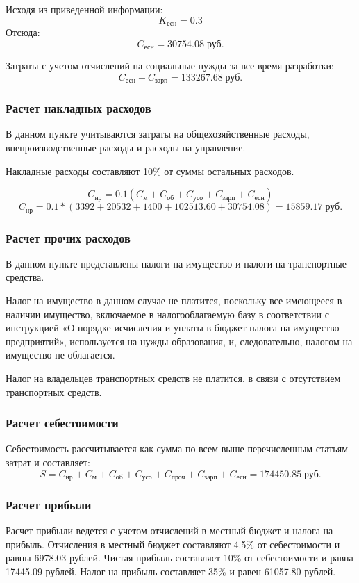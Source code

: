 \documentclass[russian,utf8,emptystyle]{eskdtext}
\begin{document}
\begin{spacing}{1.5}
Исходя из приведенной информации:
$$
K_\text{есн} = 0.3
$$
Отсюда:
$$
C_\text{есн} = 30754.08 \; \text{руб.}
$$

Затраты с учетом отчислений на социальные нужды за все время разработки:
$$
C_\text{есн} + C_\text{зарп} = 133267.68 \; \text{руб.}
$$

\subsubsection{Расчет накладных расходов}

В данном пункте учитываются затраты на общехозяйственные расходы, внепроизводственные расходы и расходы на управление.

Накладные расходы составляют 10\% от суммы остальных расходов.

$$
C_\text{нр} = 0.1(C_\text{м} + C_\text{об} + C_\text{усо} + C_\text{зарп} + C_\text{есн}) 
$$
$$
C_\text{нр} = 0.1*(3392 + 20532 + 1400 + 102513.60 + 30754.08) = 15859.17 \; \text{руб.}
$$

\subsubsection{Расчет прочих расходов}
В данном пункте представлены налоги на имущество и налоги на транспортные средства.

Налог на имущество в данном случае не платится, поскольку все имеющееся в наличии имущество, включаемое в налогооблагаемую базу в соответствии с инструкцией «О порядке исчисления и уплаты в бюджет налога на имущество предприятий», используется на нужды образования, и, следовательно, налогом на имущество не облагается.

Налог на владельцев транспортных средств не платится, в связи с отсутствием транспортных средств. 

\subsubsection{Расчет себестоимости}
Себестоимость рассчитывается как сумма по всем выше перечисленным статьям затрат и составляет:
$$
S = C_\text{нр} + C_\text{м} + C_\text{об} + C_\text{усо} + C_\text{проч} + C_\text{зарп} + C_\text{есн} = 174450.85 \; \text{руб.}
$$

\subsubsection{Расчет прибыли}
Расчет прибыли ведется с учетом отчислений в местный бюджет и налога на прибыль. Отчисления в местный бюджет составляют 4.5\% от себестоимости и равны 6978.03 рублей. Чистая прибыль составляет 10\% от себестоимости и равна 17445.09 рублей. Налог на прибыль составляет 35\% и равен 61057.80 рублей.


\end{spacing}
\end{document}
